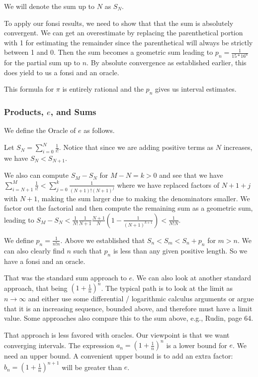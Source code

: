 \documentclass[12pt]{article}
\theoremstyle{remark}
\begin{document}
We will denote the sum up to $N$ as $S_N$.

To apply our fonsi results, we need to show that that the sum is absolutely convergent. We can get an overestimate by replacing the parenthetical portion with 1 for estimating the remainder since the parenthetical will always be strictly between 1 and 0. Then the sum becomes a geometric sum leading to $p_n = \frac{1}{15*16^n}$ for the partial sum up to $n$. By absolute convergence as established earlier, this does yield to us a fonsi and an oracle.  

This formula for $\pi$ is entirely rational and the $p_n$ gives us interval estimates.

\subsubsection{Products, $e$, and Sums}\label{sec:e}

We define the Oracle of $e$ as follows. 

Let $S_N = \sum_{i=0}^N \frac{1}{i!}$. Notice that since we are adding positive terms as $N$ increases, we have $S_N < S_{N+1}$. 

We also can compute $S_M - S_N$ for $M - N = k > 0$ and see that we have $\sum_{i=N+1}^M \frac{1}{i!} <  \sum_{j=0}^k  \frac{1}{(N+1)!(N+1)^j} $ where we have replaced factors of $N+1 + j$ with $N+1$, making the sum larger due to making the denominators smaller. We factor out the factorial and then compute the remaining sum as a geometric sum, leading to $S_M - S_N < \frac{1}{N!} \frac{1}{N+1} \frac{N+1}{N} (1 - \frac{1}{(N+1)^{k+1}} ) < \frac{1}{N! N}$.

We define $p_n = \frac{1}{n!n}$. Above we established that $S_n < S_m < S_n + p_n$ for $m> n$. We can also clearly find $n$ such that $p_n$ is less than any given positive length. So we have a fonsi and an oracle. 

That was the standard sum approach to $e$. We can also look at another standard approach, that being $(1+\frac{1}{n})^n$. The typical path is to look at the limit as $n\to \infty$ and either use some differential / logarithmic calculus arguments or argue that it is an increasing sequence, bounded above, and therefore must have a limit value. Some approaches also compare this to the sum above, e.g., Rudin\cite{rudin}, page 64. 

That approach is less favored with oracles. Our viewpoint is that we want converging intervals. The expression $a_n = (1+\frac{1}{n})^n$ is a lower bound for $e$. We need an upper bound. A convenient upper bound is to add an extra factor: $b_n = (1+\frac{1}{n})^{n+1}$ will be greater than $e$. 
\end{document}
